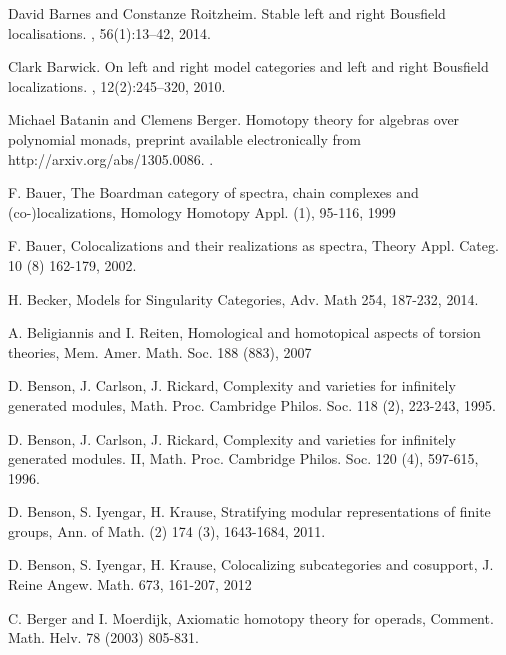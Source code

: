 \documentclass[11pt,reqno]{amsart}
\theoremstyle{definition}
\numberwithin{equation}{subsection}
\begin{document}
\begin{thebibliography}{AAAAAA}
David Barnes and Constanze Roitzheim.
\newblock Stable left and right {B}ousfield localisations.
, 56(1):13--42, 2014.

Clark Barwick.
\newblock On left and right model categories and left and right {B}ousfield
  localizations.
, 12(2):245--320, 2010.

Michael Batanin and Clemens Berger.
\newblock Homotopy theory for algebras over polynomial monads, preprint
  available electronically from http://arxiv.org/abs/1305.0086.
.

 F. Bauer, The {B}oardman category of spectra, chain complexes and (co-)localizations, Homology Homotopy Appl. (1), 95-116, 1999

 F. Bauer, Colocalizations and their realizations as spectra, Theory Appl. Categ. 10 (8) 162-179, 2002.

 H. Becker, Models for Singularity Categories, Adv. Math 254, 187-232, 2014.

 A. Beligiannis and I. Reiten, Homological and homotopical aspects of torsion theories, Mem. Amer. Math. Soc. 188 (883), 2007

 D. Benson, J. Carlson, J. Rickard, Complexity and varieties for infinitely generated modules, Math. Proc. Cambridge Philos. Soc. 118 (2), 223-243, 1995.

 D. Benson, J. Carlson, J. Rickard, Complexity and varieties for infinitely generated modules. {II}, Math. Proc. Cambridge Philos. Soc. 120 (4), 597-615, 1996.

 D. Benson, S. Iyengar, H. Krause, Stratifying modular representations of finite groups, Ann. of Math. (2) 174 (3), 1643-1684, 2011.

 D. Benson, S. Iyengar, H. Krause, Colocalizing subcategories and cosupport, J. Reine Angew. Math. 673, 161-207, 2012

C. Berger and I. Moerdijk, Axiomatic homotopy theory for operads, Comment. Math. Helv. 78 (2003) 805-831.



\end{thebibliography}
\end{document}
